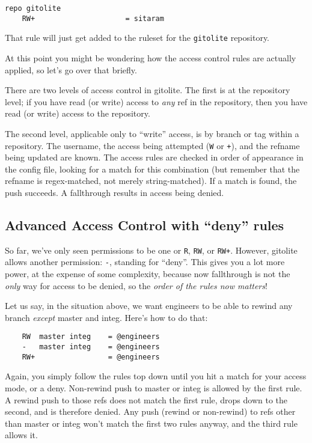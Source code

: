 \documentclass[a4paper]{book}
\begin{document}
\begin{shaded}\begin{verbatim}
repo gitolite
    RW+                     = sitaram
\end{verbatim}\end{shaded}

That rule will just get added to the ruleset for the \texttt{gitolite} repository.

At this point you might be wondering how the access control rules are actually applied, so let's go over that briefly.

There are two levels of access control in gitolite. The first is at the repository level; if you have read (or write) access to \emph{any} ref in the repository, then you have read (or write) access to the repository.

The second level, applicable only to “write” access, is by branch or tag within a repository. The username, the access being attempted (\texttt{W} or \texttt{+}), and the refname being updated are known. The access rules are checked in order of appearance in the config file, looking for a match for this combination (but remember that the refname is regex-matched, not merely string-matched). If a match is found, the push succeeds. A fallthrough results in access being denied.

\subsection{Advanced Access Control with “deny” rules}

So far, we've only seen permissions to be one or \texttt{R}, \texttt{RW}, or \texttt{RW+}. However, gitolite allows another permission: \texttt{-}, standing for “deny”. This gives you a lot more power, at the expense of some complexity, because now fallthrough is not the \emph{only} way for access to be denied, so the \emph{order of the rules now matters}!

Let us say, in the situation above, we want engineers to be able to rewind any branch \emph{except} master and integ. Here's how to do that:

\begin{shaded}\begin{verbatim}
    RW  master integ    = @engineers
    -   master integ    = @engineers
    RW+                 = @engineers
\end{verbatim}\end{shaded}

Again, you simply follow the rules top down until you hit a match for your access mode, or a deny. Non-rewind push to master or integ is allowed by the first rule. A rewind push to those refs does not match the first rule, drops down to the second, and is therefore denied. Any push (rewind or non-rewind) to refs other than master or integ won't match the first two rules anyway, and the third rule allows it.
\end{document}
